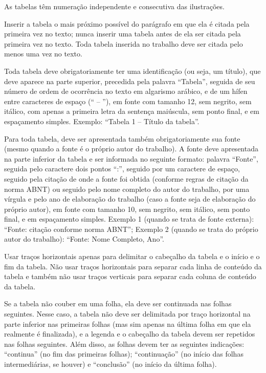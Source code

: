 \documentclass[
	12pt,				%
	oneside,			%
	a4paper,			%
	english,			%
	brazil				%
	]{abntex2ppgsi}
\begin{document}
\begin{anexosenv}
As tabelas têm numeração independente e consecutiva das ilustrações.

Inserir a tabela o mais próximo possível do parágrafo em que ela é citada pela primeira vez no texto; nunca inserir uma tabela antes de ela ser citada pela primeira vez no texto. Toda tabela inserida no trabalho deve ser citada pelo menos uma vez no texto.

Toda tabela deve obrigatoriamente ter uma identificação (ou seja, um título), que deve aparece na parte superior, precedida pela palavra ``Tabela'', seguida de seu número de ordem de ocorrência no texto em algarismo arábico, e de um hífen entre caracteres de espaço (`` – ''), em fonte com tamanho 12, sem negrito, sem itálico, com apenas a primeira letra da sentença maiúscula, sem ponto final, e em espaçamento simples. Exemplo: ``Tabela 1 – Título da tabela''.

Para toda tabela, deve ser apresentada também obrigatoriamente sua fonte (mesmo quando a fonte é o próprio autor do trabalho). A fonte deve apresentada na parte inferior da tabela e ser informada no seguinte formato: palavra ``Fonte'', seguida pelo caractere dois pontos ``:'', seguido por um caractere de espaço, seguido pela citação de onde a fonte foi obtida (conforme regras de citação da norma ABNT) ou seguido pelo nome completo do autor do trabalho, por uma vírgula e pelo ano de elaboração do trabalho (caso a fonte seja de elaboração do próprio autor), em fonte com tamanho 10, sem negrito, sem itálico, sem ponto final, e em espaçamento simples. Exemplo 1 (quando se trata de fonte externa): ``Fonte: citação conforme norma ABNT''; Exemplo 2 (quando se trata do próprio autor do trabalho): ``Fonte: Nome Completo, Ano''.

Usar traços horizontais apenas para delimitar o cabeçalho da tabela e o início e o fim da tabela. Não usar traços horizontais para separar cada linha de conteúdo da tabela e também não usar traços verticais para separar cada coluna de conteúdo da tabela. 

Se a tabela não couber em uma folha, ela deve ser continuada nas folhas seguintes. Nesse caso, a tabela não deve ser delimitada por traço horizontal na parte inferior nas primeiras folhas (mas sim apenas na última folha em que ela realmente é finalizada), e a legenda e o cabeçalho da tabela devem ser repetidos nas folhas seguintes. Além disso, as folhas devem ter as seguintes indicações: ``continua'' (no fim das primeiras folhas); ``continuação'' (no início das folhas intermediárias, se houver) e ``conclusão'' (no início da última folha).


\end{anexosenv}
\end{document}
